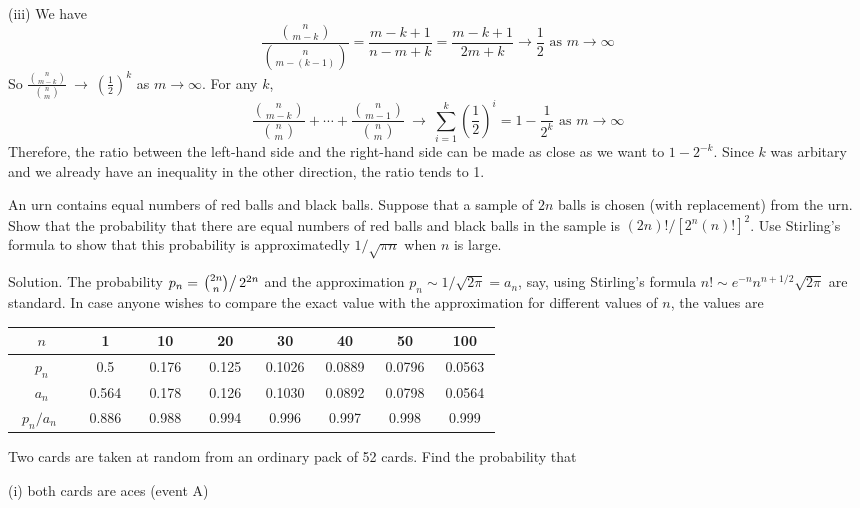 (iii) We have 
\begin{equation}
\frac{\binom{n}{m-k}}{\binom{n}{m-(k-1)}} = \frac{m-k+1}{n-m+k} = \frac{m-k+1}{2m+k}\to \frac{1}{2} \text{ as }m\to \infty
\end{equation}
So $\frac{\binom{n}{m-k}}{\binom{n}{m}}\ \to\ \left(\frac{1}{2}\right)^k$ as $m\to \infty$. For any $k$, 
\begin{equation}
\frac{\binom{n}{m-k}}{\binom{n}{m}} + \cdots + \frac{\binom{n}{m-1}}{\binom{n}{m}} \ \to \ \sum^k_{i=1}\left(\frac{1}{2}\right)^i= 1-\frac{1}{2^k} \text{ as }m\to \infty
\end{equation}
Therefore, the ratio between the left-hand side and the right-hand side can be made as close as we want to $1-2^{-k}$. Since $k$ was arbitary and we already have an inequality in the other direction, the ratio tends to 1.


\item An urn contains equal numbers of red balls and black balls. Suppose that a sample of $2n$ balls is chosen (with replacement) from the urn. Show that the probability that there are equal numbers of red balls and black balls in the sample is $(2n)!/[2^n(n)!]^2$. Use Stirling's formula to show that this probability is approximatedly $1/\sqrt{\pi n}$ when $n$ is large.



Solution. The probability $p_n=\left.\binom{2n}{n}\right/2^{2n}$ and the approximation $p_n\sim 1/\sqrt{2\pi}=a_n$, say, using Stirling's formula $n!\sim e^{-n}n^{n+1/2}\sqrt{2\pi}$ are standard. In case anyone wishes to compare the exact value with the approximation for different values of $n$, the values are

\begin{tabular}{cccccccc}
\hline
$n$ & 1 & 10 & 20 & 30 & 40 & 50 & 100 \\ \hline
$p_n$ & 0.5 & 0.176 & 0.125 & 0.1026 & 0.0889 & 0.0796 & 0.0563 \\ \hline
$a_n$ & 0.564 & 0.178 & 0.126 & 0.1030 & 0.0892 & 0.0798 & 0.0564 \\ \hline
\ $p_n/a_n$ \ &\ 0.886\ &\  0.988\  &\  0.994\  &\  0.996\  &\  0.997\  &\  0.998\  &\  0.999\  \\ \hline
\end{tabular}


\item Two cards are taken at random from an ordinary pack of 52 cards. Find the probability that 

(i) both cards are aces (event A)

